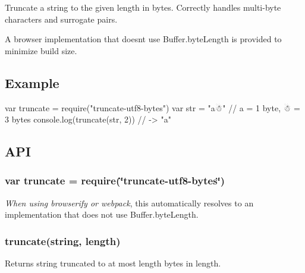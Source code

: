 Truncate a string to the given length in bytes. Correctly handles multi-\/byte characters and surrogate pairs.

A browser implementation that doesn\textquotesingle{}t use {\ttfamily Buffer.\+byte\+Length} is provided to minimize build size.

\subsection*{Example}


\begin{DoxyCode}
var truncate = require("truncate-utf8-bytes")
var str = "a☃" // a = 1 byte, ☃ = 3 bytes
console.log(truncate(str, 2))
// -> "a"
\end{DoxyCode}


\subsection*{A\+PI}

\subsubsection*{{\ttfamily var truncate = require(\char`\"{}truncate-\/utf8-\/bytes\char`\"{})}}

{\itshape When using browserify or webpack}, this automatically resolves to an implementation that does not use {\ttfamily Buffer.\+byte\+Length}.

\subsubsection*{{\ttfamily truncate(string, length)}}

Returns {\ttfamily string} truncated to at most {\ttfamily length} bytes in length. 